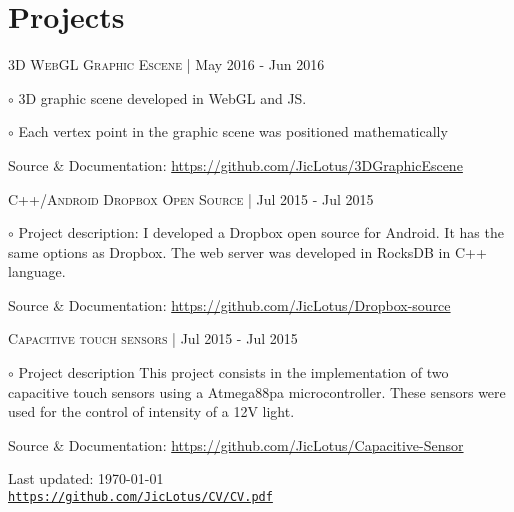 \documentclass[letterpaper]{article}
\def\footerlink{https://github.com/JicLotus/CV/CV.pdf}
\renewenvironment{itemize}{
  \begin{list}{}{
    \setlength{\leftmargin}{1.5em}
  }
}{
  \end{list}
}
\newenvironment{no-indent-itemize}{
  \begin{list}{}{
    \setlength{\leftmargin}{0em}
  }
}{
  \end{list}
}
\def\bullet{$\circ$\xspace}
\begin{document}
\section*{Projects}
\begin{no-indent-itemize}
  \item \textsc{3D WebGL Graphic Escene} | May 2016 - Jun 2016
    \begin{itemize}
    \item\bullet 3D graphic scene developed in WebGL and JS.
    \item\bullet Each vertex point in the graphic scene was positioned mathematically
    \end{itemize}
    \begin{itemize}
    \item Source \& Documentation: \href{https://github.com/JicLotus/3DGraphicEscene}{https://github.com/JicLotus/3DGraphicEscene}
    
    \end{itemize}

\item \textsc{C++/Android Dropbox Open Source} | Jul 2015 - Jul 2015
    \begin{itemize}
        \item\bullet Project description: I developed a Dropbox open source for Android. It has the same options as Dropbox. The web server was developed in RocksDB in C++ language.
        
        Source \& Documentation: \href{https://github.com/JicLotus/Dropbox-source}{https://github.com/JicLotus/Dropbox-source}
    \end{itemize}

\item \textsc{Capacitive touch sensors} |  Jul 2015 - Jul 2015

    \begin{itemize}
        \item\bullet Project description This project consists in the implementation of two capacitive touch sensors using a Atmega88pa microcontroller. These sensors were used for the control of intensity of a 12V light.
        
        Source \& Documentation: \href{https://github.com/JicLotus/Capacitive-Sensor}{https://github.com/JicLotus/Capacitive-Sensor}
    \end{itemize}

\end{no-indent-itemize}

\bigskip
\begin{center}
  \begin{footnotesize}
    Last updated: \today \\
    \href{\footerlink}{\texttt{\footerlink}}
  \end{footnotesize}
\end{center}
\end{document}
